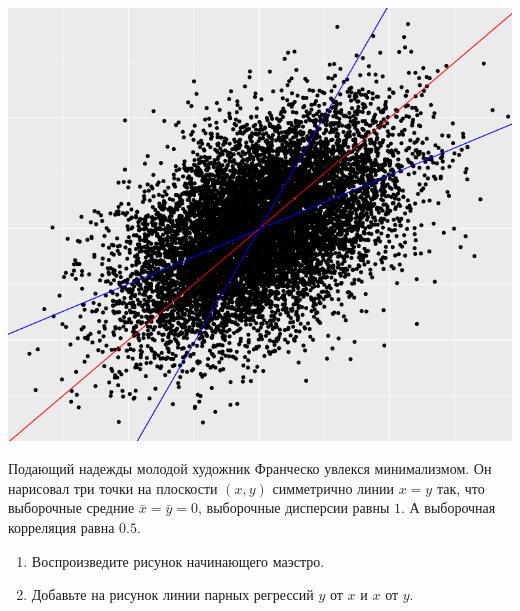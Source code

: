 \begin{problem}
\begin{sol}
\includegraphics[scale=0.5]{figure/correlation_05.png}

\end{sol}
\end{problem}
  


\begin{problem}
Подающий надежды молодой художник Франческо увлекся минимализмом. 
Он нарисовал три точки на плоскости $(x, y)$ симметрично линии $x=y$ так, что
выборочные средние $\bar x = \bar y = 0$, выборочные дисперсии равны $1$.
А выборочная корреляция равна $0.5$.
\begin{enumerate}
\item Воспроизведите рисунок начинающего маэстро.
\item Добавьте на рисунок линии парных регрессий $y$ от $x$ и $x$ от $y$. 
\end{enumerate}
\begin{sol}
\end{sol}
\end{problem}



